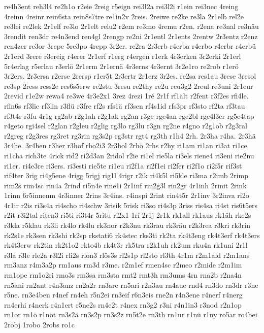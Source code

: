 {re4h3ent
reh3l4
re2h1o
r2eie
2reig
r5eign
rei3l2a
rei3l2i
r1ein
rei3nec
4reing
4reinn
4reinr
rein6sta
rein8s7tre
re1in2v
2reis.
2reiwe
re2ke
re3la
2r1elb
rel2e
re3lei
re2lek
2r1elf
re3lo
2r1elt
relu2
r2em
re3mo
4remu
r2en.
r2ena
re3nal
re3näu
3rendit
ren3dr
re4n3end
ren4gl
2rengp
re2ni
2r1entl
2r1ents
2rentw
2r3entz
r2enz
ren4zer
re3or
3repe
5re3po
4repp
3r2er.
re2ra
2r3erb
r4erba
r4erbo
r4erbr
r4erbü
2r1erd
3rere
r3ereig
r4erer
2r1erf
r1erg
r4ergen
r1erk
4r3erken
3r2erki
2r1erl
5r4erlag
r5erlau
r3erlö
2r1erm
2r1ernä
4r3erns
4r3ernt
3r2e1ro
re2rob
r1erö
3r2ers.
2r3ersa
r2erse
2rersp
r1er5t
2r3ertr
2r1erz
3r2es.
re2sa
res1au
3rese
3resol
re3sp
2ress
ress2e
res6s5erw
re2stu
3resu
re2thy
re2u
reu3g2
2reul
re3uni
2r1eur
2revid
r1e2w
rewa4
re3we
4r3e2x1
3rez
4rezi
1ré
2r1f
rf1ält
r2fent
r3f2es
rfi4le.
rfin6s
rf3lic
rf3lin
r3flü
r3fre
rf2s
rfs1ä
rf3sen
rf4s1id
rfs3pr
rf3sto
rf2ta
rf3tau
rf3t4r
r3fu
4r1g
rg2ab
r2g1ah
r2g1ak
rg2an
r3ge
rge4an
rge2bl
rge4l3er
rg5e4tap
r4geto
rgi4sel
r2glan
r2gleu
r2glig
rg3lo
rg3lu
r3gn
rg2ne
r4gno
r2g1ob
r2g3ral
r2greg
r2g3res
rg3ret
rg3rin
rg3s2p
rg3str
rgt4
rg3th
r1h4
2rh.
2r3ha
r4ha.
2r3hä
3r4he.
3r4hen
r3her
r3hof
rho2i3
2r3hol
2rhö
2rhs
r2hy
ri1am
ri1an
ri3at
ri1ce
ri1cha
rich3te
4rick
rid2
ri2d3an
2ridol
r2ie
ri1el
rie5la
ri3els
riene4
ri3eni
rie2nu
ri1er.
ri4e3re
ri3ers.
ri3esti
rie5te
ri1eu
ri2f1a
ri2f1ei
ri2fer
ri2f1o
ri2f5r
rif3st
rif4ter
3rig
ri4g5ene
4rigg
5rigj
rig1l
4rigr
r2ik
ri4k5l
ri5kle
ri3ma
r2imb
2rimp
rim2s
rim4sc
rin4a
2rind
ri5n4e
rine1i
2r1inf
rin2g3l
rin2gr
4r1inh
2rinit
2rink
1rinn
6r5innenm
4r3inner
2rins
3r4ins.
r4inspi
2rint
rin4t5r
2r1inv
3r2inva
ri2o
4r1ir
r2is
ri3s4a
ri4scho
ri4schw
3risik
5risk
ri3so
ri4s3p
3riss
ris4sa
ri4st
ris6t5ers
r2it
r3i2tal
riten3
ri5ti
ri3t4r
5ritu
ri2x1
1rí
2r1j
2r1k
rk1all
rk1aus
rk1äh
rke2s
r3kla
r5klau
rk3li
rk4lo
rk4lu
rk3nor
r2k3nu
rk3rau
rk3räu
r2k3rea
r3kri
rk3rin
rk2s1e
rk3sen
rk3shi
rk2sp
rkstati6
rk4stec
rks3ti
rk2ta
rk4t3eng
rk4t3erf
rk4t3ers
rk4t3erw
rk2tin
rk2t1o2
rkto4b
rk4t3r
rk5tra
r2k1uh
rk2um
rku4n
rk1uni
2r1l
r3la
r3le
rle2a
r3l2i
rli2s
rlon3
rlös3s
rl2s1p
rl2sto
rl3th
4r1m
r2m1ald
r2m1ans
rm3anz
r4m3a2p
rm1aus
rm3d
r3me.
r2m1ef
rmen4sc
r2meo
r2mide
r2m1im
rm1ope
rm1o2ri
rmo3s
rm3sa
rm3sta
rmt2
rmt3h
rm3ums
4rn
rna2b
r2na4n
rn5ani
rn2ant
r4n3anz
rn2a2r
rn3are
rn5ari
r2n3au
rn4aue
rnd4
rn3do
rn3dr
r3ne
r5ne.
rn3e4ben
r4nef
rn4eh
r5n2ei
rn3eif
r6n3eis
rne2n
r4n3ene
r4nerf
r4nerg
rn4erhi
r4nerk
r4n1ert
r5ne2s
rn4e2t
r4nex
rn3g2
r3ni
r4n1in3
r3nod
r2n1op
rn1or
rn1ö
r1nöt
rn3s2ä
rn3s2p
rn3s2z
rn5t2e
rn3th
rn1ur
r1nü
r1ny
ro5ar
ro4bei
2robj
1robo
2robs
ro1c
}

